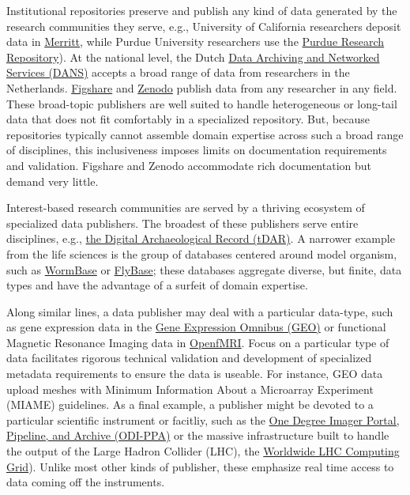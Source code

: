 \documentclass[10pt,a4paper,twocolumn]{article}
\begin{document}
{Institutional repositories preserve and publish any kind of data generated by the research communities they serve, e.g., University of California researchers deposit data in \href{https://merritt.cdlib.org/}{Merritt}, while Purdue University researchers use the \href{https://purr.purdue.edu/}{Purdue Research Repository}).
At the national level, the Dutch \href{http://www.dans.knaw.nl/en}{Data Archiving and Networked Services (DANS)} accepts a broad range of data from researchers in the Netherlands.
\href{http://figshare.com/}{Figshare} and \href{http://zenodo.org/}{Zenodo} publish data from any researcher in any field.
These broad-topic publishers are well suited to handle heterogeneous or long-tail data that does not fit comfortably in a specialized repository.
But, because repositories typically cannot assemble domain expertise across such a broad range of disciplines, this inclusiveness imposes limits on documentation requirements and validation.
Figshare and Zenodo accommodate rich documentation but demand very little.

Interest-based research communities are served by a thriving ecosystem of specialized data publishers.
The broadest of these publishers serve entire disciplines, e.g., \href{http://www.tdar.org/}{the Digital Archaeological Record (tDAR)}.
A narrower example from the life sciences is the group of databases centered around model organism, such as \href{http://www.wormbase.org/}{WormBase}\cite{harris_wormbase_2014} or \href{http://flybase.org/}{FlyBase}\cite{pierre_flybase_2014}; these databases aggregate diverse, but finite, data types and have the advantage of a surfeit of domain expertise.

Along similar lines, a data publisher may deal with a particular data-type, such as gene expression data in the \href{http://www.ncbi.nlm.nih.gov/geo/}{Gene Expression Omnibus (GEO)} or functional Magnetic Resonance Imaging data in \href{https://openfmri.org/}{OpenfMRI}.
Focus on a particular type of data facilitates rigorous technical validation and development of specialized metadata requirements to ensure the data is useable.
For instance, GEO data upload meshes with Minimum Information About a Microarray Experiment (MIAME)\cite{brazma_minimum_2001} guidelines\cite{edgar_ncbi_2006}.
As a final example, a publisher might be devoted to a particular scientific instrument or facitliy, such as the \href{http://portal.odi.iu.edu}{One Degree Imager Portal, Pipeline, and Archive (ODI-PPA)} or the massive infrastructure built to handle the output of the Large Hadron Collider (LHC), the \href{http://wlcg.web.cern.ch/}{Worldwide LHC Computing Grid}).
Unlike most other kinds of publisher, these emphasize real time access to data coming off the instruments.

}
\end{document}
